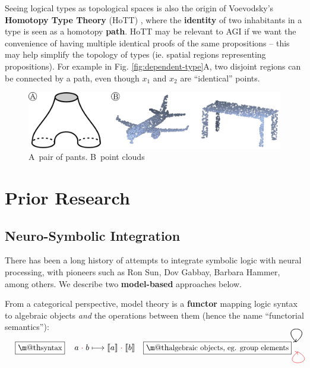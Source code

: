 \documentclass[orivec]{llncs}
\makeatletter
\newcommand{\tikzmark}[1]{\tikz[overlay,remember picture] \node (#1) {};}
\newcommand{\circA}{\textcircled{\scriptsize{A}} \,}
\newcommand{\circB}{\textcircled{\scriptsize{B}} \,}
\renewcommand{\boxed}[1]{\fbox{\m@th$\displaystyle\scalebox{0.9}{#1}$} \,}
\makeatother
\begin{document}
Seeing logical types as topological spaces is also the origin of Voevodsky's \textbf{Homotopy Type Theory} (HoTT) \cite{Voevodsky2013}, where the \textbf{identity} of two inhabitants in a type is seen as a homotopy \textbf{path}.  HoTT may be relevant to AGI if we want the convenience of having multiple identical proofs of the same propositions -- this may help simplify the topology of types (ie. spatial regions representing propositions).  For example in Fig. \ref{fig:dependent-type}A, two disjoint regions can be connected by a path, even though $x_1$ and $x_2$ are ``identical'' points.

\begin{figure}[h]
\centering
\includegraphics[scale=0.5]{figure-1.png}
\caption{\circA pair of pants. \circB point clouds}
\label{fig:1}
\end{figure}

\section{Prior Research}

\subsection{Neuro-Symbolic Integration}

There has been a long history of attempts to integrate symbolic logic with neural processing, with pioneers such as Ron Sun, Dov Gabbay, Barbara Hammer, among others.  We describe two \textbf{model-based} approaches below.

From a categorical perspective, model theory is a \textbf{functor} mapping logic syntax to algebraic objects \textit{and} the operations between them (hence the name ``functorial semantics''):

\begin{equation}
\boxed{\mbox{syntax}} \quad
\tikzmark{a1} a \tikzmark{c1} \; {\color{red}\cdot} \; \tikzmark{b1} b \longmapsto \llbracket \tikzmark{a2} a \rrbracket \tikzmark{c2} \; {\color{red}\cdot} \; \llbracket \tikzmark{b2} b \rrbracket
\quad \boxed{\mbox{algebraic objects, eg. group elements}}
\begin{tikzpicture}[overlay, remember picture, distance=1.1cm]
\draw[->, out=40, in=135, transform canvas={shift={(4pt,10pt)}}] (a1.center) to (a2.center);
\draw[->, out=40, in=135, transform canvas={shift={(4pt,10pt)}}] (b1.center) to (b2.center);
\draw[->, out=-30, in=-140, transform canvas={shift={(6pt,-2pt)}}, red] (c1.center) to (c2.center);
\end{tikzpicture}
\end{equation}
\end{document}
